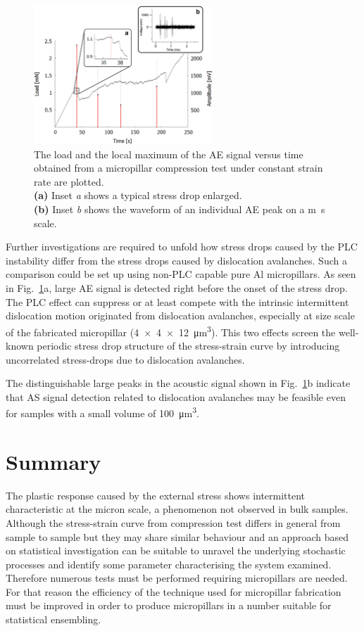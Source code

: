 \begin{figure}[htbp!] 
\centering    
\includegraphics[width=0.6\textwidth]{Micron-Scale_Deformation3}
\caption[Load curve and AE signals]{The load and the local maximum of the AE signal versus time obtained from a micropillar compression test under constant strain rate are plotted.\\
\textbf{(a)} Inset \textit{a} shows a typical stress drop enlarged.\\
\textbf{(b)} Inset \textit{b} shows the waveform of an individual AE peak on a \si{m\second} scale.}
\label{fig:loadAE_time}
\end{figure}

Further investigations are required to unfold how stress drops caused by the PLC instability differ from the stress drops caused by dislocation avalanches. Such a comparison could be set up using non-PLC capable pure Al micropillars. As seen in Fig.~\ref{fig:loadAE_time}a, large AE signal is detected right before the onset of the stress drop. The PLC effect can suppress or at least compete with the intrinsic intermittent dislocation motion originated from dislocation avalanches, especially at size scale of the fabricated micropillar (\SI{4x4x12}{\micro m^3}). This two effects screen the well-known periodic stress drop structure of the stress-strain curve by introducing uncorrelated stress-drops due to dislocation avalanches.

The distinguishable large peaks in the acoustic signal shown in Fig.~\ref{fig:loadAE_time}b indicate that AS signal detection related to dislocation avalanches may be feasible even for samples with a small volume of \SI{100}{\micro m^3}.

\section{Summary}
The plastic response caused by the external stress shows intermittent characteristic at the micron scale, a phenomenon not observed in bulk samples. Although the stress-strain curve from compression test differs in general from sample to sample but they may share similar behaviour and an approach based on statistical investigation can be suitable to unravel the underlying stochastic processes and identify some parameter characterising the system examined. Therefore numerous tests must be performed requiring micropillars are needed. For that reason the efficiency of the technique used for micropillar fabrication must be improved in order to produce micropillars in a number suitable for statistical ensembling.

